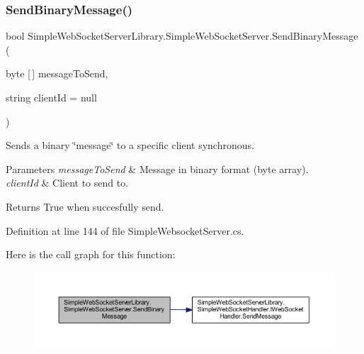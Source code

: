 \subsubsection{\texorpdfstring{Send\+Binary\+Message()}{SendBinaryMessage()}}
{\footnotesize\ttfamily bool Simple\+Web\+Socket\+Server\+Library.\+Simple\+Web\+Socket\+Server.\+Send\+Binary\+Message (\begin{DoxyParamCaption}\item[{byte \mbox{[}$\,$\mbox{]}}]{message\+To\+Send,  }\item[{string}]{client\+Id = {\ttfamily null} }\end{DoxyParamCaption})}



Sends a binary \char`\"{}message\char`\"{} to a specific client synchronous. 


\begin{DoxyParams}{Parameters}
{\em message\+To\+Send} & Message in binary format (byte array).\\
\hline
{\em client\+Id} & Client to send to.\\
\hline
\end{DoxyParams}
\begin{DoxyReturn}{Returns}
True when succesfully send.
\end{DoxyReturn}


Definition at line 144 of file Simple\+Websocket\+Server.\+cs.

Here is the call graph for this function\+:
\nopagebreak
\begin{figure}[H]
\begin{center}
\leavevmode
\includegraphics[width=350pt]{class_simple_web_socket_server_library_1_1_simple_web_socket_server_ac6ddccc7dd4b54d16721d2dca025dc58_cgraph}
\end{center}
\end{figure}
\mbox{\label{class_simple_web_socket_server_library_1_1_simple_web_socket_server_a9d94bdf3e2964c65cafc62a80102a28c}} 
